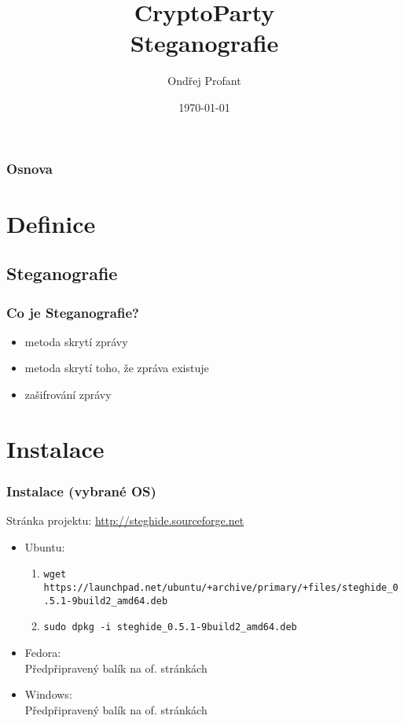 \documentclass[xetex]{beamer}
\title{CryptoParty\\Steganografie}
\author{Ondřej Profant}
\institute[Piráti]{Česká pirátská strana}
\date{\today}
\begin{document}
\begin{frame}
  \titlepage
\end{frame}

\begin{frame}
  \frametitle{Osnova}
  \tableofcontents
\end{frame}	

\section{Definice}

\subsection{Steganografie}
\begin{frame}
 \frametitle{Co je Steganografie?}
 \begin{itemize} 
		\item metoda skrytí zprávy
		\item metoda skrytí toho, že zpráva existuje
		\item zašifrování zprávy
 \end{itemize}
\end{frame}

\section{Instalace}
\begin{frame}
 \frametitle{Instalace (vybrané OS)}
	Stránka projektu: \url{http://steghide.sourceforge.net}
 \begin{itemize} 
   \item Ubuntu:
			\begin{enumerate}
				\item \scriptsize{\texttt{wget https://launchpad.net/ubuntu/+archive/primary/+files/steghide\_0.5.1-9build2\_amd64.deb}}
				\item \texttt{sudo dpkg -i steghide\_0.5.1-9build2\_amd64.deb}
			\end{enumerate}
   \item Fedora:\\
			Předpřipravený balík na of. stránkách
   \item Windows:\\
			Předpřipravený balík na of. stránkách
 \end{itemize} 
\end{frame}
\end{document}
